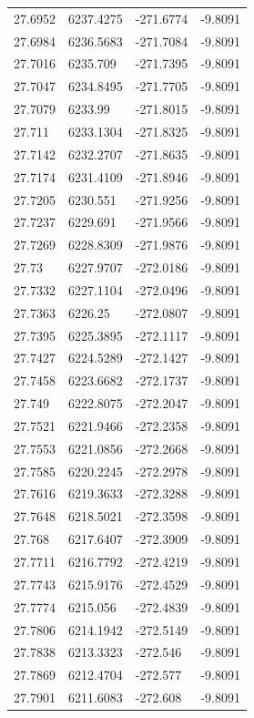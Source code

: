 \begin{table}[H]
\begin{tabular}{llll}
27.6952 & 6237.4275 & -271.6774 & -9.8091 \\
27.6984 & 6236.5683 & -271.7084 & -9.8091 \\
27.7016 & 6235.709 & -271.7395 & -9.8091 \\
27.7047 & 6234.8495 & -271.7705 & -9.8091 \\
27.7079 & 6233.99 & -271.8015 & -9.8091 \\
27.711 & 6233.1304 & -271.8325 & -9.8091 \\
27.7142 & 6232.2707 & -271.8635 & -9.8091 \\
27.7174 & 6231.4109 & -271.8946 & -9.8091 \\
27.7205 & 6230.551 & -271.9256 & -9.8091 \\
27.7237 & 6229.691 & -271.9566 & -9.8091 \\
27.7269 & 6228.8309 & -271.9876 & -9.8091 \\
27.73 & 6227.9707 & -272.0186 & -9.8091 \\
27.7332 & 6227.1104 & -272.0496 & -9.8091 \\
27.7363 & 6226.25 & -272.0807 & -9.8091 \\
27.7395 & 6225.3895 & -272.1117 & -9.8091 \\
27.7427 & 6224.5289 & -272.1427 & -9.8091 \\
27.7458 & 6223.6682 & -272.1737 & -9.8091 \\
27.749 & 6222.8075 & -272.2047 & -9.8091 \\
27.7521 & 6221.9466 & -272.2358 & -9.8091 \\
27.7553 & 6221.0856 & -272.2668 & -9.8091 \\
27.7585 & 6220.2245 & -272.2978 & -9.8091 \\
27.7616 & 6219.3633 & -272.3288 & -9.8091 \\
27.7648 & 6218.5021 & -272.3598 & -9.8091 \\
27.768 & 6217.6407 & -272.3909 & -9.8091 \\
27.7711 & 6216.7792 & -272.4219 & -9.8091 \\
27.7743 & 6215.9176 & -272.4529 & -9.8091 \\
27.7774 & 6215.056 & -272.4839 & -9.8091 \\
27.7806 & 6214.1942 & -272.5149 & -9.8091 \\
27.7838 & 6213.3323 & -272.546 & -9.8091 \\
27.7869 & 6212.4704 & -272.577 & -9.8091 \\
27.7901 & 6211.6083 & -272.608 & -9.8091 \\

\end{tabular}
\end{table}
